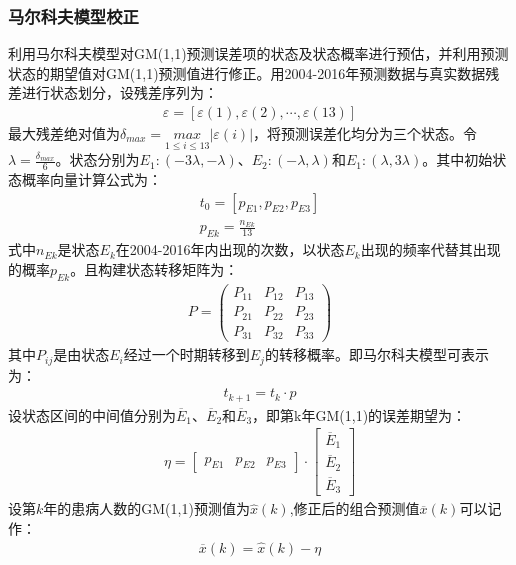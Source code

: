 \documentclass{whutmod}
\begin{document}
	     \subsubsection{马尔科夫模型校正}
	     利用马尔科夫模型对GM(1,1)预测误差项的状态及状态概率进行预估，并利用预测状态的期望值对GM(1,1)预测值进行修正。用2004-2016年预测数据与真实数据残差进行状态划分，设残差序列为：
	     \begin{gather}
	    \varepsilon =[\varepsilon(1) ,\varepsilon(2), \cdots,\varepsilon(13)]
	     \end{gather}
	    最大残差绝对值为$\delta _{max}=\underset{1\leqslant i\leqslant13 }{max}\left | \varepsilon(i) \right |$，将预测误差化均分为三个状态。令$\lambda =\frac{\delta _{max}}{6}$。状态分别为$E_{1}:(-3\lambda,-\lambda)$、$E_{2}:(-\lambda,\lambda)$和$E_{1}:(\lambda,3\lambda)$。其中初始状态概率向量计算公式为：
	   \begin{gather}
	 t_{0}=[p_{E1},p_{E2},p_{E3}]\\
	 p_{Ek}=\frac{n_{Ek}}{13}
	  \end{gather}
	  式中$n_{Ek}$是状态$E_{k}$在2004-2016年内出现的次数，以状态$E_{k}$出现的频率代替其出现的概率$p_{Ek}$。且构建状态转移矩阵为：
	   \begin{gather}
	  P=\left(\begin{array}{lll}{P_{11}} & {P_{12}} & {P_{13}} \\ {P_{21}} & {P_{22}} & {P_{23}} \\ {P_{31}} & {P_{32}} & {P_{33}}\end{array}\right)
	  \end{gather}
	  其中$P_{ij}$是由状态$E_{i}$经过一个时期转移到$E_{j}$的转移概率。即马尔科夫模型可表示为：	  
	   \begin{gather}
	   t_{k+1}=t_{k} \cdot p
	  \end{gather}
	  设状态区间的中间值分别为$\overline{E}_{1}$、$\overline{E}_{2}$和$\overline{E}_{3}$，即第k年GM(1,1)的误差期望为：
	   \begin{gather}
\eta =\begin{bmatrix}
p_{E1} & p_{E2} & p_{E3}
\end{bmatrix} \cdot\begin{bmatrix}
\overline{E}_{1}\\ 
\overline{E}_{2}\\ 
\overline{E}_{3}
\end{bmatrix}
	  \end{gather}
	  设第$k$年的患病人数的GM(1,1)预测值为$\widehat{x}(k)$,修正后的组合预测值$\overline{x}(k)$可以记作：
	     \begin{gather}
	     \overline{x}(k) =\widehat{x}(k)-\eta
	   \end{gather}
\end{document}
